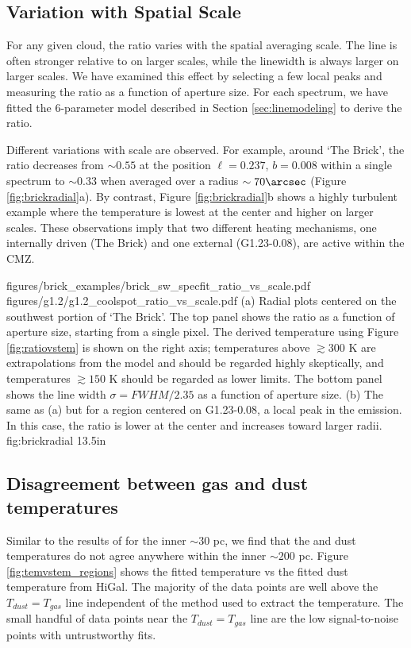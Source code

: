\subsection{Variation with Spatial Scale}
For any given cloud, the ratio \Rone varies with the spatial averaging scale.
The \para \threeohthree line is often stronger relative to \threetwoone on
larger scales, while the linewidth is always larger on larger scales.  We have
examined this effect by selecting a few local \para \threeohthree peaks and
measuring the ratio \Rone as a function of aperture size.  For each spectrum,
we have fitted the 6-parameter model described in Section
\ref{sec:linemodeling} to derive the ratio.

Different variations with scale are observed.  For example, around `The Brick',
the ratio decreases from $\sim0.55$ at the position $\ell=0.237$, $b=0.008$
within a single spectrum to $\sim0.33$ when averaged over a radius
$\sim70\arcsec$ (Figure \ref{fig:brickradial}a).  By contrast, Figure
\ref{fig:brickradial}b shows a highly turbulent example where the temperature
is lowest at the center and higher on larger scales.  These observations imply
that two different heating mechanisms, one internally driven (The Brick) and
one external (G1.23-0.08), are active within the CMZ.

\FigureTwo
{figures/brick_examples/brick_sw_specfit_ratio_vs_scale.pdf}
{figures/g1.2/g1.2_coolspot_ratio_vs_scale.pdf}
{(a) Radial plots centered on the southwest portion of `The Brick'.
The top panel shows the ratio \Rone as a function of aperture size, starting
from a single pixel.
The derived temperature using Figure \ref{fig:ratiovstem} is shown on the right
axis; temperatures above $\gtrsim300$ K are extrapolations from the model and
should be regarded highly skeptically, and temperatures $\gtrsim150$ K should
be regarded as lower limits.
The bottom panel shows the line width $\sigma = FWHM/2.35$
as a function of aperture size.  
(b) The same as (a) but for a region centered on G1.23-0.08, a local
peak in the \para \threeohthree emission.  In this case,
the ratio \Rone is lower at the center and increases toward larger radii.
}
{fig:brickradial}
{1}{3.5in}



\subsection{Disagreement between gas and dust temperatures}
Similar to the results of \citet{Ao2013a} for the inner $\sim30$ pc, we find
that the \para and dust temperatures do not agree anywhere within the inner
$\sim200$ pc.  Figure \ref{fig:temvstem_regions} shows the fitted \para
temperature vs the fitted dust temperature from HiGal.  The majority of the
\formaldehyde data points are well above the $T_{dust}=T_{gas}$ line
independent of the method used to extract the temperature.  The small handful
of data points near the $T_{dust}=T_{gas}$ line are the low signal-to-noise
points with untrustworthy fits.


